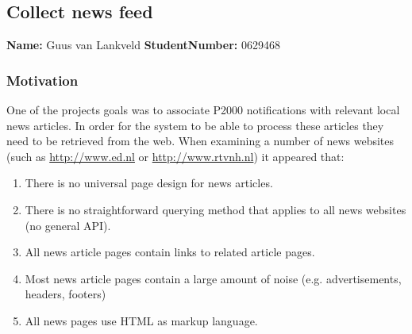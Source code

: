 \subsection{Collect news feed}
\textbf{Name:} Guus van Lankveld \indent \textbf{StudentNumber:} 0629468

\subsubsection*{Motivation}
One of the projects goals was to associate P2000 notifications with relevant local news articles. In order for the system to be able to process these articles they need to be retrieved from the web. When examining a number of news websites (such as \url{http://www.ed.nl} or  \url{http://www.rtvnh.nl}) it appeared that:
\begin{enumerate}
\item There is no universal page design for news articles.
\item There is no straightforward querying method that applies to all news websites (no general API).
\item All news article pages contain links to related article pages.
\item Most news article pages contain a large amount of noise (e.g. advertisements, headers, footers)
\item All news pages use HTML as markup language.
\end{enumerate}

